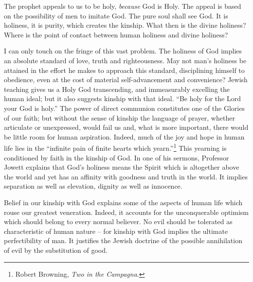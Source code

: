 The prophet appeals to us to be holy, \textsl{because} God is
Holy. The appeal is based on the possibility of men to
imitate God. The pure soul shall see God. It is holiness,
it is purity, which creates the kinship. What then is the
divine holiness? Where is the point of contact between
human holiness and divine holiness?

I can only touch on the fringe of this vast problem.
The holiness of God implies an absolute standard of love,
truth and righteousness. May not man's holiness be
attained in the effort he makes to approach this standard,
disciplining himself to obedience, even at the cost of
material self-advancement and convenience? Jewish teaching
gives us a Holy God transcending, and immeasurably
excelling the human ideal; but it also suggests kinship
with that ideal. ``Be holy for the Lord your God is holy.''
The power of direct communion constitutes one of the
Glories of our faith; but without the sense of kinship the
language of prayer, whether articulate or unexpressed,
would fail us and, what is more important, there would be
little room for human aspiration. Indeed, much of the joy
and hope in human life lies in the ``infinite pain of finite
hearts which yearn.''\footnote{Robert Browning, \textsl{Two in the Campagna}.} This yearning is conditioned by faith
in the kinship of God. In one of his sermons, Professor
Jowett explains that God's holiness means the
Spirit which is altogether above the world and yet has an
affinity with goodness and truth in the world. It implies
separation as well as elevation, dignity as well as innocence.

Belief in our kinship with God explains some of the
aspects of human life which rouse our greatest veneration.
Indeed, it accounts for the unconquerable optimism which
should belong to every normal believer. No evil should be
tolerated as characteristic of human nature -- for kinship
with God implies the ultimate perfectibility of man. It
justifies the Jewish doctrine of the possible annihilation
of evil by the substitution of good.

